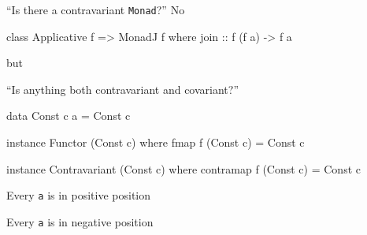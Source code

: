 \documentclass[UKenglish,usenames,dvipsnames,svgnames,table,aspectratio=169,mathserif]{beamer}
\newcommand{\nl}{\vspace{\baselineskip}}
\begin{document}
\begin{frame}[fragile]

{\Large
``Is there a contravariant {\tt Monad}?'' No
}

\nl

\begin{haskellcode}
class Applicative f => MonadJ f where
  join :: f (f a) -> f a
\end{haskellcode}

but

\end{frame}


\begin{frame}[fragile]

{\Large
``Is anything both contravariant and covariant?''
}
\nl

\begin{haskellcode}
data Const c a = Const c

instance Functor (Const c) where
  fmap f (Const c) = Const c

instance Contravariant (Const c) where
  contramap f (Const c) = Const c
\end{haskellcode}

\nl

Every {\tt a} is in positive position

Every {\tt a} is in negative position

\end{frame}
\end{document}
